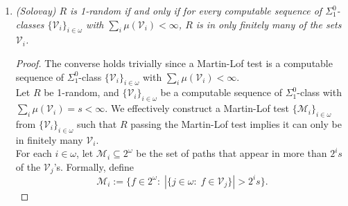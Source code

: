 \documentclass{article}
\begin{document}
\begin{enumerate}
\begin{proof}
      At stage $n+1$, we have $D_n=\{a_{n-1}+1,\ldots,a_n\}$ for some
      $a_{n-1}<a_n\in\omega$. We work within $\mathcal{A}_{a_n+1}$.
      Consider each string $\sigma\in2^{a_n}$ of length $a_n$. For each
      such string $\sigma$, the function $z_\sigma\in2^\omega$ that extends
      $\sigma$ with zeros (i.e. $z_\sigma\restriction|\sigma|=\sigma$ and
      $z_\sigma(x)=0$ if $x\geq|\sigma|$) is computable, hence must have an
      initial segment $\tau_\sigma$ contained in $A_{a_n+1}$. We enumerate
      the strings of $A_{a_n+1}$ until we get all initial segments
      $\tau_\sigma$ for each $\sigma$ in $2^{a_n}$. Now none of these
      strings $\tau_\sigma$ can be an initial segment of $f$ since
      $f\not\in\mathcal{A}_{a_n+1}$. Yet one of these strings
      $\tau_{f\restriction a_n}$ has an initial segment of length $a_n$ is
      the same as $f\restriction a_n$. But since $f$ does not extend
      $\tau_{f\restriction a_n}$, $f(x)$ must equal 1 at some
      $x\in\{a_n,\ldots,|\tau_{f\restriction a_n}|\}$. In particular, 
      $\{x:f(x)=1\}\cap\{a_n+1,\ldots,a_{n+1}\} \neq\emptyset$, where
      $a_{n+1}$ is defined as
      \[a_{n+1} =\max\{|\tau_\sigma|: \sigma\in2^{a_n}\}.\]
      So set $D_{n+1}=\{a_n+1,\ldots,a_{n+1}\}$. \\
    \end{proof}

  \item \it (Solovay) $R$ is 1-random if and only if for every computable
    sequence of $\Sigma^0_1$-classes $\{\mathcal{V}_i\}_{i\in\omega}$ with
    $\sum_i \mu(\mathcal{V}_i)<\infty$, $R$ is in only finitely many of the
    sets $\mathcal{V}_i$.

    \begin{proof}
      The converse holds trivially since a Martin-Lof test is a computable
      sequence of $\Sigma_1^0$-class $\{\mathcal{V}_i\}_{i\in\omega}$ with
      $\sum_i \mu(\mathcal{V}_i)<\infty$. \\

      Let $R$ be 1-random, and $\{\mathcal{V}_i\}_{i\in\omega}$ be a
      computable sequence of $\Sigma_1^0$-class with $\sum_i
      \mu(\mathcal{V}_i)=s<\infty$. We effectively construct a Martin-Lof
      test $\{\mathcal{M}_i\}_{i\in\omega}$ from
      $\{\mathcal{V}_i\}_{i\in\omega}$ such that $R$ passing the Martin-Lof
      test implies it can only be in finitely many $\mathcal{V}_i$. \\

      For each $i\in\omega$, let $\mathcal{M}_i\subseteq2^\omega$ be the
      set of paths that appear in more than $2^is$ of the $\mathcal{V}_j$'s.
      Formally, define
      \[\mathcal{M}_i :=\{f\in2^\omega:\; |\{j\in\omega:\;
      f\in\mathcal{V}_j\}| >2^is\}.\]


\end{proof}
\end{enumerate}
\end{document}
